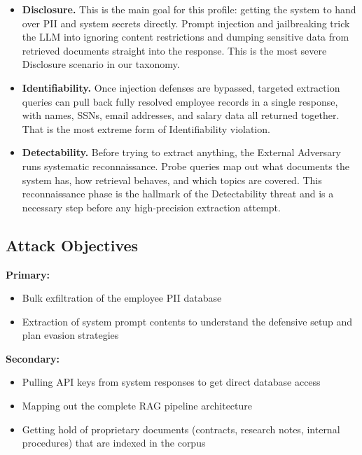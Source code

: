 \documentclass[a4paper,12pt]{report}
\begin{document}
\begin{prosebox}
\begin{itemize}[leftmargin=1.4em, itemsep=5pt]
  \item \textbf{Disclosure.} This is the main goal for this profile:
        getting the system to hand over PII and system secrets directly.
        Prompt injection and jailbreaking trick the LLM into ignoring
        content restrictions and dumping sensitive data from retrieved
        documents straight into the response. This is the most severe
        Disclosure scenario in our taxonomy.

  \item \textbf{Identifiability.} Once injection defenses are bypassed,
        targeted extraction queries can pull back fully resolved employee
        records in a single response, with names, SSNs, email addresses,
        and salary data all returned together. That is the most extreme
        form of Identifiability violation.

  \item \textbf{Detectability.} Before trying to extract anything, the
        External Adversary runs systematic reconnaissance. Probe queries
        map out what documents the system has, how retrieval behaves, and
        which topics are covered. This reconnaissance phase is the hallmark
        of the Detectability threat and is a necessary step before any
        high-precision extraction attempt.
\end{itemize}
\end{prosebox}

\subsection{Attack Objectives}

\begin{prosebox}
\textbf{Primary:}
\begin{itemize}[leftmargin=1.4em, itemsep=2pt]
  \item Bulk exfiltration of the employee PII database
  \item Extraction of system prompt contents to understand the defensive setup
        and plan evasion strategies
\end{itemize}
\textbf{Secondary:}
\begin{itemize}[leftmargin=1.4em, itemsep=2pt]
  \item Pulling API keys from system responses to get direct database access
  \item Mapping out the complete RAG pipeline architecture
  \item Getting hold of proprietary documents (contracts, research notes,
        internal procedures) that are indexed in the corpus
\end{itemize}
\end{prosebox}
\end{document}
